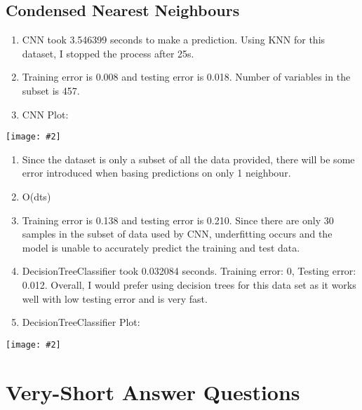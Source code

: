 \documentclass{article}
\newcommand{\fig}[2]{\texttt{[image: \#2]}}
\def\enum#1{\begin{enumerate}#1\end{enumerate}}
\begin{document}
\subsection{Condensed Nearest Neighbours}
\enum{
\item CNN took 3.546399 seconds to make a prediction. Using KNN for this dataset, I stopped the process after 25s.
\item Training error is 0.008 and testing error is 0.018. Number of variables in the subset is 457.
\item CNN Plot:
}
\fig{1}{CNNPlot}

\enum{
\item Since the dataset is only a subset of all the data provided, there will be some error introduced when basing predictions on only 1 neighbour.
\item O(dts)
\item Training error is 0.138 and testing error is 0.210. Since there are only 30 samples in the subset of data used by CNN, underfitting occurs and the model is unable to accurately predict the training and test data.
\item DecisionTreeClassifier took 0.032084 seconds. Training error: 0, Testing error: 0.012. Overall, I would prefer using decision trees for this data set as it works well with low testing error and is very fast.
\item DecisionTreeClassifier Plot:
}
\fig{1}{DecisionTreeClassifierPlot}




\section{Very-Short Answer Questions}
\end{document}
